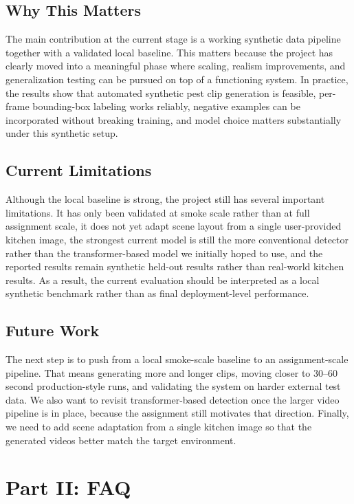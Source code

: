 \documentclass[11pt]{article}
\begin{document}
\subsection*{Why This Matters}
The main contribution at the current stage is a working synthetic data pipeline together with a validated local baseline. This matters because the project has clearly moved into a meaningful phase where scaling, realism improvements, and generalization testing can be pursued on top of a functioning system. In practice, the results show that automated synthetic pest clip generation is feasible, per-frame bounding-box labeling works reliably, negative examples can be incorporated without breaking training, and model choice matters substantially under this synthetic setup.

\subsection*{Current Limitations}
Although the local baseline is strong, the project still has several important limitations. It has only been validated at smoke scale rather than at full assignment scale, it does not yet adapt scene layout from a single user-provided kitchen image, the strongest current model is still the more conventional detector rather than the transformer-based model we initially hoped to use, and the reported results remain synthetic held-out results rather than real-world kitchen results. As a result, the current evaluation should be interpreted as a local synthetic benchmark rather than as final deployment-level performance.

\subsection*{Future Work}
The next step is to push from a local smoke-scale baseline to an assignment-scale pipeline. That means generating more and longer clips, moving closer to 30--60 second production-style runs, and validating the system on harder external test data. We also want to revisit transformer-based detection once the larger video pipeline is in place, because the assignment still motivates that direction. Finally, we need to add scene adaptation from a single kitchen image so that the generated videos better match the target environment.


\clearpage
\section*{Part II: FAQ}
\end{document}
